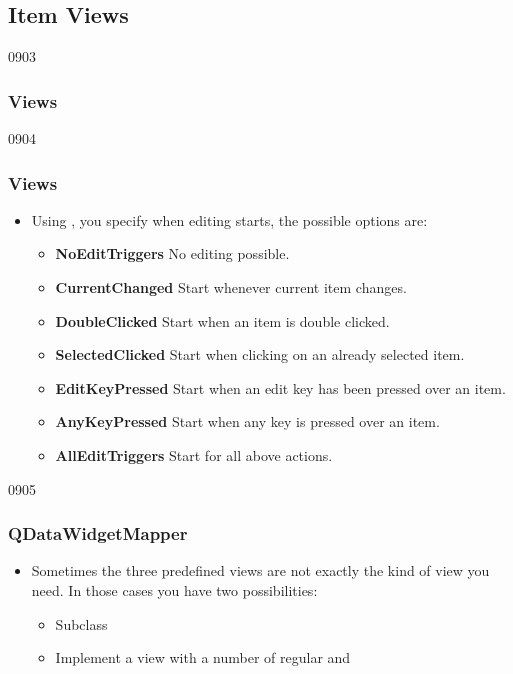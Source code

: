 \subsection{Item Views}
\begin{slide}{0903}\frametitle{Views}\label{model_view_views}
\vfill
{}
\vfill
\end{slide}

\begin{slide}{0904}\frametitle{Views}
\begin{itemize}
\item Using , you specify when
  editing starts, the possible options are:
  \begin{itemize}
    \item \textbf{NoEditTriggers} No editing possible.
    \item \textbf{CurrentChanged} Start whenever current item changes.
    \item \textbf{DoubleClicked} Start when an item is double clicked.
    \item \textbf{SelectedClicked} Start when clicking on an already selected item.
    \item \textbf{EditKeyPressed} Start when an edit key has been pressed over an item.
    \item \textbf{AnyKeyPressed} Start when any key is pressed over an item.
    \item \textbf{AllEditTriggers} Start for all above actions.
  \end{itemize}
\end{itemize}
\end{slide}

\begin{slide}{0905}\frametitle{QDataWidgetMapper}
\begin{itemize}
\item Sometimes the three predefined views are not exactly the kind of view
  you need. In those cases you have two possibilities:
  \begin{itemize}
  \item Subclass 
  \item Implement a view with a number of regular  and 
  \end{itemize}
\end{itemize}
\\[1cm]
\hfill{}\hfill{}\hfill\strut
\end{slide}


